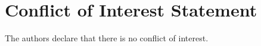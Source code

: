 \documentclass[utf8]{frontiersSCNS} %
\begin{document}





\section*{Conflict of Interest Statement}
The authors declare that there is no conflict of interest.
\end{document}
